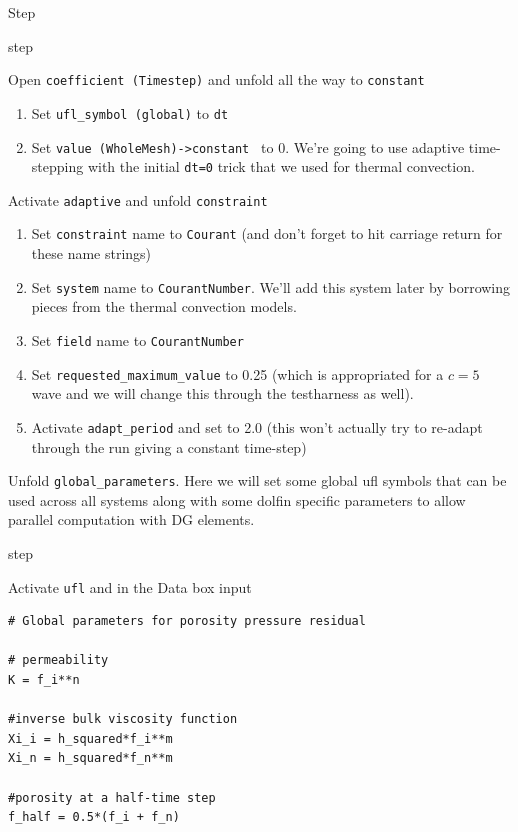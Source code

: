 \begin{steps}{Step}
\begin{steps}{step}
  \item Open \texttt{coefficient (Timestep)} and unfold all the way to \texttt{constant}
    \begin{enumerate}
    \item Set \texttt{ufl\_symbol (global)} to \texttt{dt}
    \item Set \texttt{value (WholeMesh)->constant } to 0.  We're
      going to use adaptive time-stepping with the initial \texttt{dt=0} trick
      that we used for thermal convection.
    \end{enumerate}
  \item Activate \texttt{adaptive} and unfold \texttt{constraint}
    \begin{enumerate}
    \item Set \texttt{constraint} name to \texttt{Courant}
      (and don't forget to hit carriage return for these name strings)
    \item Set \texttt{system} name to \texttt{CourantNumber}.  We'll
      add this system later by borrowing pieces from the thermal
      convection models.
    \item Set  \texttt{field} name to \texttt{CourantNumber}
    \item Set \texttt{requested\_maximum\_value} to 0.25 (which is
      appropriated for a $c=5$ wave and we will change this through
      the testharness as well).
    \item Activate \texttt{adapt\_period} and set to 2.0 (this won't actually try
      to re-adapt through the run giving a constant time-step)      
    \end{enumerate}
  \end{steps}
\item Unfold \texttt{global\_parameters}. Here we will set some global
  ufl symbols that can be used across all systems along with some
  dolfin specific parameters to allow parallel computation with DG elements.
  \begin{steps}{step}
  \item Activate \texttt{ufl} and in the Data box input
    \begin{lstlisting}[style=UFL]
# Global parameters for porosity pressure residual 

# permeability
K = f_i**n

#inverse bulk viscosity function
Xi_i = h_squared*f_i**m
Xi_n = h_squared*f_n**m

#porosity at a half-time step
f_half = 0.5*(f_i + f_n)


\end{lstlisting}
\end{steps}
\end{steps}
